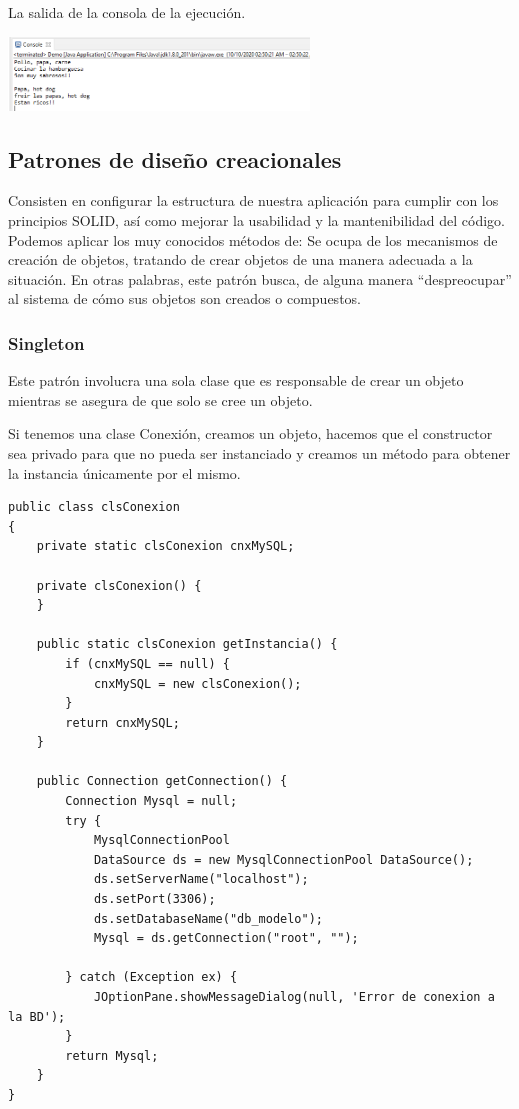\documentclass[twoside,twocolumn]{article}
\begin{document}
La salida de la consola de la ejecución.

\includegraphics[width=8cm]{Imagenes/imagen5}


\subsection{Patrones de diseño creacionales}


Consisten en configurar la estructura de nuestra aplicación para cumplir con los principios SOLID, así como mejorar la usabilidad y la mantenibilidad del código. Podemos aplicar los muy conocidos métodos de:
Se ocupa de los mecanismos de creación de objetos, tratando de crear objetos de una manera adecuada a la situación.
En otras palabras, este patrón busca, de alguna manera “despreocupar” al sistema de cómo sus objetos son creados o compuestos.



\subsubsection{Singleton}


Este patrón involucra una sola clase que es responsable de crear un objeto mientras se asegura de que solo se cree un objeto. 



Si tenemos una clase Conexión, creamos un objeto, hacemos que el constructor sea privado para que no pueda ser instanciado y creamos un método para obtener la instancia únicamente por el mismo.
\lstset{breaklines=true,style=sharpc}
\begin{lstlisting}
public class clsConexion
{
    private static clsConexion cnxMySQL;

    private clsConexion() {
    }    

    public static clsConexion getInstancia() {
        if (cnxMySQL == null) {
            cnxMySQL = new clsConexion();
        }
        return cnxMySQL;
    }

    public Connection getConnection() {
        Connection Mysql = null;
        try {
            MysqlConnectionPool 
            DataSource ds = new MysqlConnectionPool DataSource();
            ds.setServerName("localhost");
            ds.setPort(3306);
            ds.setDatabaseName("db_modelo");
            Mysql = ds.getConnection("root", "");

        } catch (Exception ex) {
            JOptionPane.showMessageDialog(null, 'Error de conexion a la BD');
        }
        return Mysql;
    }
}
\end{lstlisting}
\end{document}
